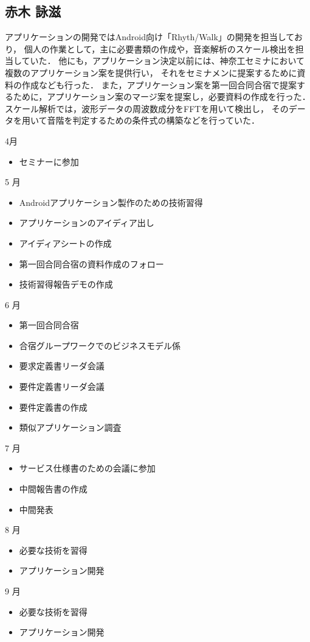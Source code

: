 \subsection{赤木 詠滋}
アプリケーションの開発ではAndroid向け「Rhyth/Walk」の開発を担当しており，
個人の作業として，主に必要書類の作成や，音楽解析のスケール検出を担当していた．
他にも，アプリケーション決定以前には、神奈工セミナにおいて複数のアプリケーション案を提供行い，
それをセミナメンに提案するために資料の作成なども行った．
また，アプリケーション案を第一回合同合宿で提案するために，アプリケーション案のマージ案を提案し，必要資料の作成を行った．
スケール解析では，波形データの周波数成分をFFTを用いて検出し，
そのデータを用いて音階を判定するための条件式の構築などを行っていた．\par
4月
\begin{itemize}
\item セミナーに参加
\end{itemize}
5 月
\begin{itemize}
\item Androidアプリケーション製作のための技術習得
\item アプリケーションのアイディア出し
\item アイディアシートの作成
\item 第一回合同合宿の資料作成のフォロー
\item 技術習得報告デモの作成
\end{itemize}
6 月
\begin{itemize}
\item 第一回合同合宿
\item 合宿グループワークでのビジネスモデル係
\item 要求定義書リーダ会議
\item 要件定義書リーダ会議
\item 要件定義書の作成
\item 類似アプリケーション調査
\end{itemize}
7 月
\begin{itemize}
\item サービス仕様書のための会議に参加
\item 中間報告書の作成
\item 中間発表
\end{itemize}
8 月
\begin{itemize}
\item 必要な技術を習得
\item アプリケーション開発
\end{itemize}
9 月
\begin{itemize}
\item 必要な技術を習得
\item アプリケーション開発
\end{itemize}
